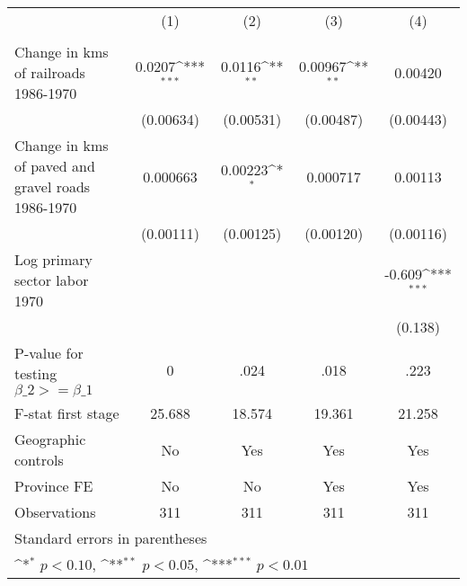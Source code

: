 {
\def\sym#1{\ifmmode^{#1}\else\(^{#1}\)\fi}
\begin{tabular}{l*{4}{c}}
\hline\hline
                &\multicolumn{1}{c}{(1)}&\multicolumn{1}{c}{(2)}&\multicolumn{1}{c}{(3)}&\multicolumn{1}{c}{(4)}\\
                &\multicolumn{1}{c}{}&\multicolumn{1}{c}{}&\multicolumn{1}{c}{}&\multicolumn{1}{c}{}\\
\hline
Change in kms of railroads 1986-1970&   0.0207\sym{***}&   0.0116\sym{**} &  0.00967\sym{**} &  0.00420         \\
                &(0.00634)         &(0.00531)         &(0.00487)         &(0.00443)         \\
[1em]
Change in kms of paved and gravel roads 1986-1970& 0.000663         &  0.00223\sym{*}  & 0.000717         &  0.00113         \\
                &(0.00111)         &(0.00125)         &(0.00120)         &(0.00116)         \\
[1em]
Log primary sector labor 1970&                  &                  &                  &   -0.609\sym{***}\\
                &                  &                  &                  &  (0.138)         \\
\hline
P-value for testing $\beta\_{2} >= \beta\_{1}$&        0         &     .024         &     .018         &     .223         \\
F-stat first stage&   25.688         &   18.574         &   19.361         &   21.258         \\
Geographic controls&       No         &      Yes         &      Yes         &      Yes         \\
Province FE     &       No         &       No         &      Yes         &      Yes         \\
Observations    &      311         &      311         &      311         &      311         \\
\hline\hline
\multicolumn{5}{l}{\footnotesize Standard errors in parentheses}\\
\multicolumn{5}{l}{\footnotesize \sym{*} \(p<0.10\), \sym{**} \(p<0.05\), \sym{***} \(p<0.01\)}\\
\end{tabular}
}
